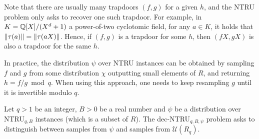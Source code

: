 Note that there are usually many trapdoors $(f,g)$ for a given $h$, and the NTRU problem only asks to recover one such trapdoor.
For example, in $K = \mathbb{Q}[X]/(X^d+1)$ a power-of-two cyclotomic field, for any $a \in K$, it holds that $\|\tau(a)\| = \|\tau(aX)\|$. Hence, if $(f,g)$ is a trapdoor for some $h$, then $(fX, gX)$ is also a trapdoor for the same $h$.

In practice, the distribution $\psi$ over NTRU instances can be obtained by sampling $f$ and $g$ from some distribution $\chi$ outputting small elements of $R$, and returning $h = f/g \bmod q$. When using this approach, one needs to keep resampling $g$ until it is invertible modulo $q$.



\begin{definition}
Let $q >1$ be an integer, $B >0$ be a real number and $\psi$ be a distribution over NTRU$_{q,B}$ instances (which is a subset of $R$). The dec-NTRU$_{q, B, \psi}$ problem asks to distinguish between samples from $\psi$ and samples from $\mathcal{U}(R_q)$.
\end{definition}

